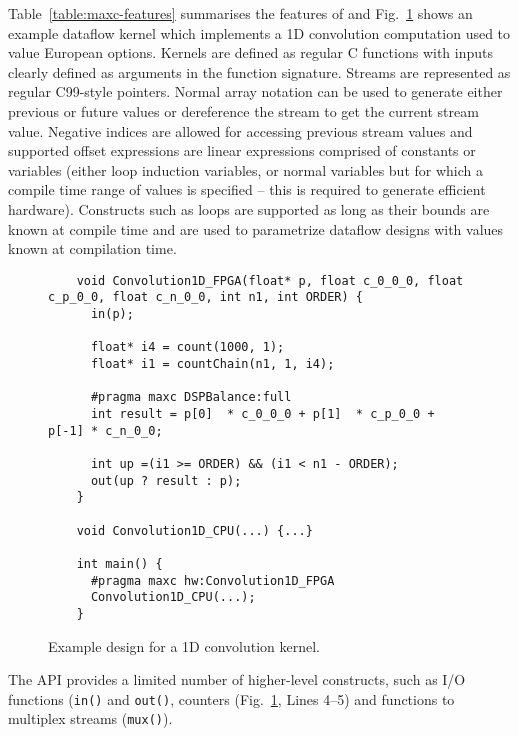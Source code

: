 Table~\ref{table:maxc-features} summarises the features of \MAXC{} and
Fig.~\ref{fig:maxc-1dconv} shows an example dataflow kernel which
implements a 1D convolution computation used to value European
options. Kernels are defined as regular C functions with inputs
clearly defined as arguments in the function signature. Streams are
represented as regular C99-style pointers.  Normal array notation can be
used to generate either previous or future values or dereference the
stream to get the current stream value. Negative indices are allowed
for accessing previous stream values and supported offset expressions
are linear expressions comprised of constants or variables (either
loop induction variables, or normal variables but for which a compile
time range of values is specified -- this is required to generate
efficient hardware). Constructs such as loops are supported as long as
their bounds are known at compile time and are used to parametrize
dataflow designs with values known at compilation time.

\lstset{style=MaxC}

\begin{figure}[!h]
  \begin{lstlisting}
    void Convolution1D_FPGA(float* p, float c_0_0_0, float c_p_0_0, float c_n_0_0, int n1, int ORDER) {
      in(p);

      float* i4 = count(1000, 1);
      float* i1 = countChain(n1, 1, i4);

      #pragma maxc DSPBalance:full
      int result = p[0]  * c_0_0_0 + p[1]  * c_p_0_0 + p[-1] * c_n_0_0;

      int up =(i1 >= ORDER) && (i1 < n1 - ORDER);
      out(up ? result : p);
    }

    void Convolution1D_CPU(...) {...}

    int main() {
      #pragma maxc hw:Convolution1D_FPGA
      Convolution1D_CPU(...);
    }
  \end{lstlisting}
  \caption{Example \MAXC{} design for a 1D convolution kernel.}
  \label{fig:maxc-1dconv}
\end{figure}


The \MAXC{} API provides a limited number of higher-level constructs, such as I/O
functions (\texttt{in()} and \texttt{out()}, counters (Fig.~\ref{fig:maxc-1dconv},
Lines 4--5) and functions to multiplex streams (\texttt{mux()}).

